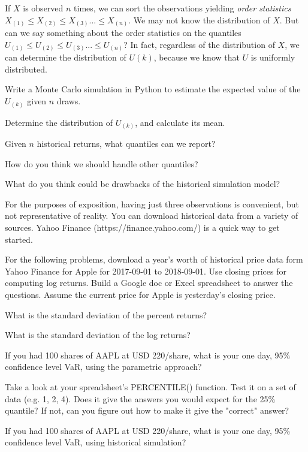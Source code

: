 \documentclass{report}
\numberwithin{problem}{chapter} %
\let\oldroblem\problem
\renewcommand{\problem}{ \oldroblem  \normalfont}
\newcommand{\vs}{\vspace}
\begin{document}
If $X$ is  observed $n$ times, we can sort the observations yielding {\it order statistics} $X_{(1)} \leq X_{(2)} \leq X_{(3)} ...  \leq X_{(n)}$. We may not know the distribution of $X$. But can we say something about the order statistics on the quantiles $U_{(1)} \leq U_{(2)} \leq U_{(3)} ...  \leq U_{(n)}$? In fact, regardless of the distribution of $X$, we can determine the distribution of $U(k)$, because we know that $U$ is uniformly distributed.

\problem Write a Monte Carlo simulation in Python to estimate the expected value of the $U_{(k)}$ given $n$ draws. 

\problem Determine the distribution of $U_{(k)}$, and calculate its mean. 

\problem Given $n$ historical returns, what quantiles can we report? 

\problem How do you think we should handle other quantiles?

\problem What do you think could be drawbacks of the historical simulation model?


\vs{1cm}
For the purposes of exposition, having just three observations is convenient, but not representative of reality. You can download historical data from a variety of sources. Yahoo Finance (https://finance.yahoo.com/) is a quick way to get started. 

For the following problems, download a year's worth of historical price data form Yahoo Finance for Apple for 2017-09-01 to 2018-09-01. Use closing prices for computing log returns.  Build a Google doc or Excel spreadsheet to answer the questions. Assume the current price for Apple is yesterday's closing price. 

\problem What is the standard deviation of the percent returns?

\problem What is the standard deviation of the log returns?

\problem If you had 100 shares of AAPL at USD 220/share, what is your one day, 95\% confidence level VaR, using the parametric approach?

\problem Take a look at your spreadsheet's PERCENTILE() function. Test it on a set of data (e.g. {1, 2, 4}). Does it give the answers you would expect for the 25\% quantile? If not, can you figure out how to make it give the "correct" answer?

\problem If you had 100 shares of AAPL at USD 220/share, what is your one day, 95\% confidence level VaR, using  historical simulation?
\end{document}
